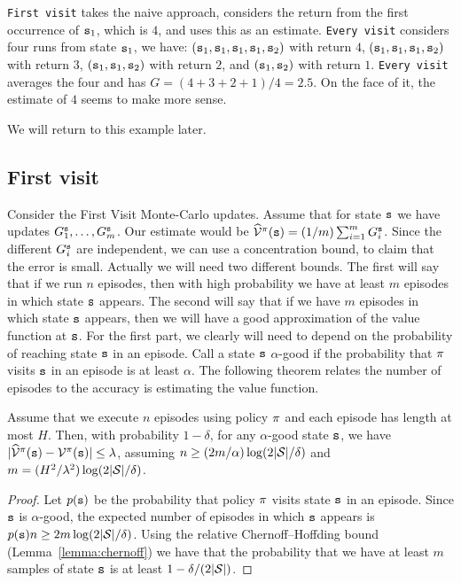 {\tt First visit} takes the naive approach, considers the return from
the first occurrence of ${\tt s}_1$, which is $4$, and uses this as
an estimate. {\tt Every visit} considers four runs from state
${\tt s}_1$, we have:
$({\tt s}_1,{\tt s}_1,{\tt s}_1,{\tt s}_1,{\tt s}_2)$ with return $4$,
$({\tt s}_1,{\tt s}_1,{\tt s}_1,{\tt s}_2)$ with return $3$,
$({\tt s}_1,{\tt s}_1,{\tt s}_2)$ with return $2$, and
$({\tt s}_1,{\tt s}_2)$ with return $1$. {\tt Every visit} averages
the four and has $G=(4+3+2+1)/4=2.5$. On the face of it, the
estimate of $4$ seems to make more sense. 
\begin{advanced}
We will return to this
example later.

\subsection{First visit}

Consider the First Visit Monte-Carlo updates. Assume that for state
${\tt s}$ we have updates $G_1^{\tt s}, \ldots , G^{\tt s}_m$. Our
estimate would be
$\widehat{\mathcal{V}}^\pi({\tt s})=(1/m)\sum_{i=1}^m G^{\tt s}_i$.
Since the different $G^{\tt s}_i$ are independent, we can use a
concentration bound, to claim that the error is small. Actually we
will need two different bounds. The first will say that if we run
$n$ episodes, then with high probability we have at least $m$
episodes in which state ${\tt s}$ appears. The second will say that if
we have $m$ episodes in which state ${\tt s}$ appears, then we will
have a good approximation of the value function at ${\tt s}$. For the first part,
we clearly will need to depend on the probability of reaching state
${\tt s}$ in an episode. Call a state ${\tt s}$ $\alpha$-good if
the probability that $\pi$ visits ${\tt s}$ in an episode is at
least $\alpha$.
The following theorem relates the number of episodes to the accuracy
is estimating the value function.

\begin{theorem}
Assume that we execute $n$ episodes using policy $\pi$ and each
episode has length at most $H$. Then, with probability $1-\delta$,
for any $\alpha$-good state ${\tt s}$, we have
$|\widehat{\mathcal{V}}^\pi({\tt s})-\mathcal{V}^\pi({\tt s})|\leq
\lambda$, assuming $n\geq (2m/\alpha)\log(2|\mathcal{S}|/\delta)$ and
$m=(H^2/\lambda^2)\log(2|\mathcal{S}|/\delta)$.
\end{theorem}

\begin{proof}
Let $p({\tt s})$ be the probability that policy $\pi$ visits
state ${\tt s}$ in an episode. Since ${\tt s}$ is $\alpha$-good, the
expected number of episodes in which ${\tt s}$ appears is
$p({\tt s})n\geq 2m\log(2|\mathcal{S}|/\delta)$. Using the relative
Chernoff--Hoffding bound (Lemma~\ref{lemma:chernoff}) we have that
the probability that we have at least $m$ samples of state ${\tt s}$
is at least $1-\delta/(2|\mathcal{S}|)$.


\end{proof}
\end{advanced}

